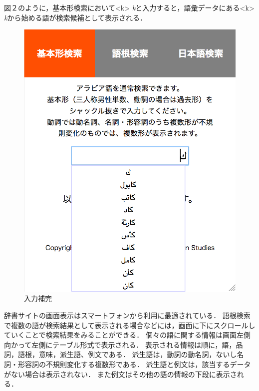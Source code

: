 \documentclass[technicalreport]{ieicej}
\begin{document}
図２のように，基本形検索において<k> \textit{k}と入力すると，語彙データにある<k> \textit{k}から始める語が検索候補として表示される．

\begin{figure}[H]
\begin{center}
\includegraphics[scale=0.4]{fig02.png}
\caption{入力補完}
\end{center}
\end{figure}

辞書サイトの画面表示はスマートフォンから利用に最適されている．
語根検索で複数の語が検索結果として表示される場合などには，画面に下にスクロールしていくことで検索結果をみることができる．
個々の語に関する情報は画面左側向かって左側にテーブル形式で表示される．
表示される情報は順に，語，品詞，語根，意味，派生語、例文である．
派生語は，動詞の動名詞，ないし名詞・形容詞の不規則変化する複数形である．
派生語と例文は，該当するデータがない場合は表示されない．
また例文はその他の語の情報の下段に表示される．
\end{document}

